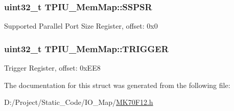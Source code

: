 \subsubsection[{S\+S\+P\+S\+R}]{\setlength{\rightskip}{0pt plus 5cm}uint32\+\_\+t T\+P\+I\+U\+\_\+\+Mem\+Map\+::\+S\+S\+P\+S\+R}\label{struct_t_p_i_u___mem_map_a3570cf26e2ddc1d5700776743b0506e3}
Supported Parallel Port Size Register, offset\+: 0x0 \hypertarget{struct_t_p_i_u___mem_map_a267271b4e2d7ad48cba1614440c741fb}{}
\subsubsection[{T\+R\+I\+G\+G\+E\+R}]{\setlength{\rightskip}{0pt plus 5cm}uint32\+\_\+t T\+P\+I\+U\+\_\+\+Mem\+Map\+::\+T\+R\+I\+G\+G\+E\+R}\label{struct_t_p_i_u___mem_map_a267271b4e2d7ad48cba1614440c741fb}
Trigger Register, offset\+: 0x\+E\+E8 

The documentation for this struct was generated from the following file\+:\begin{DoxyCompactItemize}
\item 
D\+:/\+Project/\+Static\+\_\+\+Code/\+I\+O\+\_\+\+Map/\hyperlink{_m_k70_f12_8h}{M\+K70\+F12.\+h}\end{DoxyCompactItemize}

